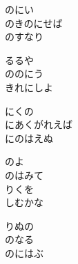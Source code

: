 \documentclass[10pt,b5j]{tarticle} %
\begin{document}
\vspace{1.5em} %
\newcommand{\linespace}{0.5em} %
\newcommand{\blocksize}{0.5\hsize} %
\begin{enumerate} %
    \begin{minipage}[c]{\blocksize}
    
        \vspace{\linespace}
        \item
        のにい\\
        のきのにせば\\
        のすなり
        
        \vspace{\linespace}
        \item
        るるや\\
        ののにう\\
        きれにしよ
        
        \vspace{\linespace}
        \item
        にくの\\
        にあくがれえば\\
        にのはえぬ
        
        \vspace{\linespace}
        \item
        のよ\\
        のはみて\\
        りくを\\
        しむかな
        
        \vspace{\linespace}
        \item
        りぬの\\
        のなる\\
        のにはぶ
    
    \end{minipage}
\end{enumerate} %
\end{document}
